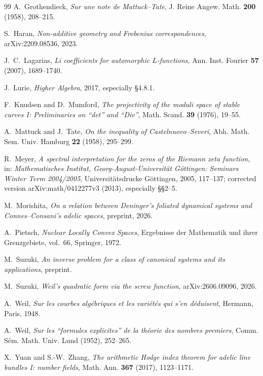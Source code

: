 \documentclass[11pt]{amsart}
\theoremstyle{definition}
\theoremstyle{remark}
\begin{document}
\begin{thebibliography}{99}
A.~Grothendieck, \emph{Sur une note de Mattuck--Tate},
J. Reine Angew. Math. \textbf{200} (1958), 208--215.

S.~Haran, \emph{Non-additive geometry and Frobenius correspondences},
arXiv:2209.08536, 2023.

J.~C.~Lagarias, \emph{Li coefficients for automorphic $L$-functions},
Ann. Inst. Fourier \textbf{57} (2007), 1689--1740.

J.~Lurie, \emph{Higher Algebra}, 2017, especially \S4.8.1.

F.~Knudsen and D.~Mumford, \emph{The projectivity of the moduli space of
stable curves I: Preliminaries on ``det'' and ``Div''}, Math. Scand.
\textbf{39} (1976), 19--55.

A.~Mattuck and J.~Tate, \emph{On the inequality of Castelnuovo--Severi},
Abh. Math. Sem. Univ. Hamburg \textbf{22} (1958), 295--299.

R.~Meyer, \emph{A spectral interpretation for the zeros of the Riemann zeta
function}, in: \emph{Mathematisches Institut, Georg-August-Universit\"at
G\"ottingen: Seminars Winter Term 2004/2005}, Universit\"atsdrucke
G\"ottingen, 2005, 117--137; corrected version arXiv:math/0412277v3 (2013),
especially \S\S2--5.

M.~Morishita, \emph{On a relation between Deninger's foliated dynamical
systems and Connes--Consani's adelic spaces}, preprint, 2026.

A.~Pietsch, \emph{Nuclear Locally Convex Spaces}, Ergebnisse der Mathematik
und ihrer Grenzgebiete, vol.~66, Springer, 1972.

M.~Suzuki, \emph{An inverse problem for a class of canonical systems and its
applications}, preprint.

M.~Suzuki, \emph{Weil's quadratic form via the screw function},
arXiv:2606.09096, 2026.

A.~Weil, \emph{Sur les courbes alg\'ebriques et les vari\'et\'es qui s'en
d\'eduisent}, Hermann, Paris, 1948.

A.~Weil, \emph{Sur les ``formules explicites'' de la th\'eorie des nombres
premiers}, Comm. S\'em. Math. Univ. Lund (1952), 252--265.

X.~Yuan and S.-W.~Zhang, \emph{The arithmetic Hodge index theorem for
adelic line bundles I: number fields}, Math. Ann. \textbf{367} (2017),
1123--1171.


\end{thebibliography}
\end{document}
